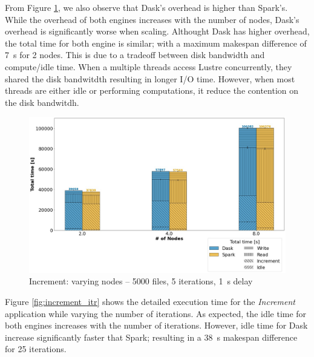 \documentclass[conference]{IEEEtran}
\begin{document}
From Figure \ref{fig:increment_worker}, we also observe that Dask's overhead is higher than Spark's.
While the overhead of both engines increases with the number of nodes, Dask's overhead is significantly worse when scaling.
Althought Dask has higher overhead, the total time for both engine is similar; with a maximum makespan difference of \SI{7}{\second} for 2 nodes.
This is due to a tradeoff between disk bandwidth and compute/idle time.
When a multiple threads access Lustre concurrently, they shared the disk bandwitdth resulting in longer I/O time.
However, when most threads are either idle or performing computations, it reduce the contention on the disk bandwitdh.
\begin{figure}[!h]
	\centering
	\includegraphics[clip,width=\columnwidth]{figures/stacked_increment_worker.jpg}
	\caption{Increment: varying nodes -- 5000 files, 5 iterations, \SI{1}{\second} delay}
	\label{fig:increment_worker}
\end{figure}

Figure \ref{fig:increment_itr} shows the detailed execution time for the \textit{Increment} application while varying the number of iterations.
As expected, the idle time for both engines increases with the number of iterations.
However, idle time for Dask increase significantly faster that Spark; resulting in a \SI{38}{\second} makespan difference for 25 iterations.
\end{document}
